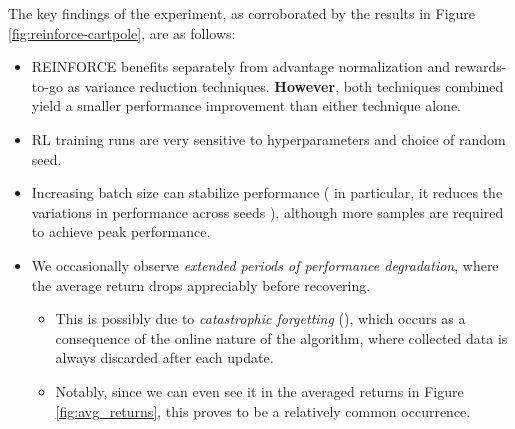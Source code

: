 \documentclass{article} %
\theoremstyle{definition}
\begin{document}
The key findings of the experiment, as corroborated
by the results in Figure \ref{fig:reinforce-cartpole}, are as follows:
\begin{itemize}
    \item REINFORCE benefits separately from advantage normalization and rewards-to-go
        as variance reduction techniques. \textbf{However}, both techniques combined
        yield a smaller performance improvement than either technique alone.
    \item RL training runs are very sensitive to hyperparameters and choice of 
        random seed.
    \item Increasing batch size can stabilize performance (
            in particular, it reduces the variations in performance across seeds
        ), although more
        samples are required to achieve peak performance.
        \item We occasionally observe \textit{extended periods of 
        performance degradation}, where the average return drops appreciably
        before recovering. 
        \begin{itemize}
            \item This is possibly due to \textit{catastrophic forgetting} (\cite{Goodfellow-et-al-2013}), which occurs as a consequence of the online nature of the algorithm,
            where collected data is always discarded after each update.
            \item Notably, since we can even see it in the averaged returns in Figure \ref{fig:avg_returns},
            this proves to be a relatively common occurrence.
        \end{itemize}
\end{itemize}
\end{document}
